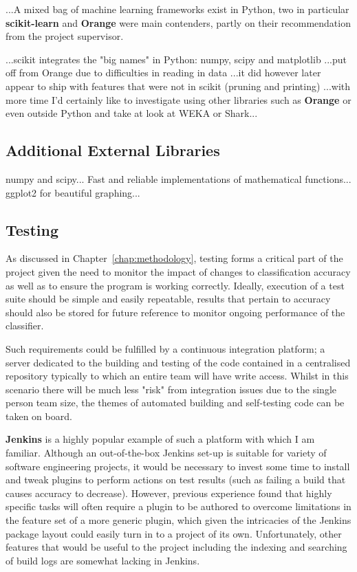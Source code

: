 ...A mixed bag of machine learning frameworks exist in Python, two in particular
\textbf{scikit-learn}\citep{scikit-learn} and \textbf{Orange}\citep{orange}
were main contenders, partly on their recommendation from the project
supervisor.

...scikit integrates the "big names" in Python: numpy, scipy and matplotlib
...put off from Orange due to difficulties in reading in data ...it did however
later appear to ship with features that were not in scikit (pruning and
printing) ...with more time I'd certainly like to investigate using other
libraries such as \textbf{Orange} or even outside Python and take at look at WEKA
or Shark...

\subsection{Additional External Libraries}
numpy\citep{numpyscipy} and scipy\citep{scipy}... Fast and reliable implementations of
mathematical functions...  ggplot2\citep{ggplot2} for beautiful graphing...


\subsection{Testing}

As discussed in Chapter~\ref{chap:methodology}, testing forms a critical part of
the project given the need to monitor the impact of changes to classification
accuracy as well as to ensure the program is working correctly. Ideally,
execution of a test suite should be simple and easily repeatable, results that
pertain to accuracy should also be stored for future reference to monitor
ongoing performance of the classifier.

Such requirements could be fulfilled by a continuous integration platform; a
server dedicated to the building and testing of the code contained in a
centralised repository typically to which an entire team will have write
access\citep{fowler-ci}. Whilst in this scenario there will be much less "risk"
from integration issues due to the single person team size, the themes of
automated building and self-testing code can be taken on board.

\textbf{Jenkins} is a highly popular\cite{jenkins-stats} example of such a
platform with which I am familiar. Although an out-of-the-box Jenkins set-up is
suitable for variety of software engineering projects, it would be necessary to
invest some time to install and tweak plugins to perform actions on test results
(such as failing a build that causes accuracy to decrease). However, previous
experience found that highly specific tasks will often require a plugin to be
authored to overcome limitations in the feature set of a more generic plugin,
which given the intricacies of the Jenkins package layout could easily
turn in to a project of its own. Unfortunately, other features that would be
useful to the project including the indexing and searching of build logs are
somewhat lacking in Jenkins.

